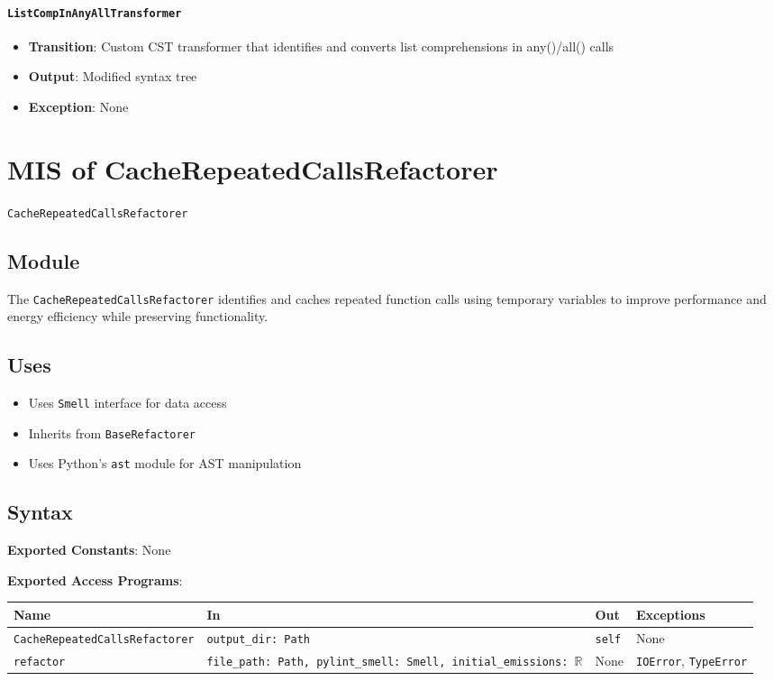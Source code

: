 \documentclass[12pt, titlepage]{article}
\begin{document}
\paragraph{\texttt{ListCompInAnyAllTransformer}}
\begin{itemize}
\item \textbf{Transition}: Custom CST transformer that identifies and converts list comprehensions in any()/all() calls
\item \textbf{Output}: Modified syntax tree
\item \textbf{Exception}: None
\end{itemize}

\section{MIS of CacheRepeatedCallsRefactorer} \label{mis:CacheCalls}

\texttt{CacheRepeatedCallsRefactorer}

\subsection{Module}
The \texttt{CacheRepeatedCallsRefactorer} identifies and caches repeated function calls using temporary variables to improve performance and energy efficiency while preserving functionality.

\subsection{Uses}
\begin{itemize}
\item Uses \texttt{Smell} interface for data access
\item Inherits from \texttt{BaseRefactorer}
\item Uses Python's \texttt{ast} module for AST manipulation
\end{itemize}

\subsection{Syntax}
\noindent
\textbf{Exported Constants}: None

\noindent
\textbf{Exported Access Programs}:\\
\begin{tabularx}{\linewidth}{|l|>{\raggedright\arraybackslash}X|l|l|}
  \hline
  \textbf{Name} & \textbf{In} & \textbf{Out} & \textbf{Exceptions} \\\hline
  \texttt{CacheRepeatedCallsRefactorer} & \texttt{output\_dir: Path} & \texttt{self} & None \\
  \hline
  \texttt{refactor} & \texttt{file\_path: Path, pylint\_smell: Smell, initial\_emissions: $\mathbb{R}$} & None & \texttt{IOError}, \texttt{TypeError} \\
  \hline
\end{tabularx}
\end{document}
